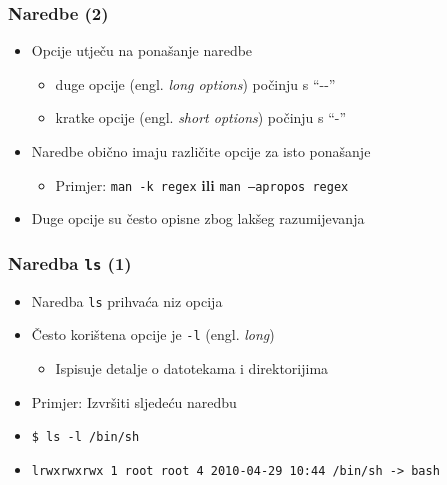 \documentclass{beamer}
\begin{document}
\begin{frame}[t]
\frametitle{Naredbe (2)}
\begin{itemize}
  \item Opcije utječu na ponašanje naredbe
  \begin{itemize}
    \item duge opcije (engl. \emph{long options}) počinju s ``-{}-''  
    \item kratke opcije (engl. \emph{short options}) počinju s ``-''
  \end{itemize}
  \item Naredbe obično imaju različite opcije za isto ponašanje
  \begin{itemize}
    \item Primjer: \texttt{man -k regex} \textbf{ili}
          \texttt{man --apropos regex}
  \end{itemize}
  \item Duge opcije su često opisne zbog lakšeg razumijevanja
\end{itemize}
\end{frame}

\begin{frame}[t]
\frametitle{Naredba \texttt{ls} (1)}
\begin{itemize}
  \item Naredba \texttt{ls} prihvaća niz opcija
  \item Često korištena opcije je \texttt{-l} (engl. \emph{long})
  \begin{itemize}
    \item Ispisuje detalje o datotekama i direktorijima
  \end{itemize}
  \item Primjer: Izvršiti sljedeću naredbu
  \item[] \small\texttt{\$ ls -l /bin/sh}
  \item[] \small\texttt{lrwxrwxrwx 1 root root 4 2010-04-29 10:44 /bin/sh 
                        -> bash}
\end{itemize}
\end{frame}
\end{document}
